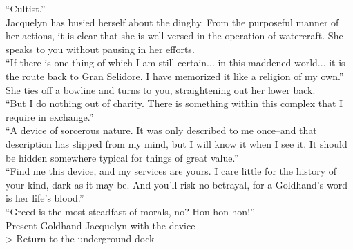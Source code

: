 “Cultist.”\\

Jacquelyn has busied herself about the dinghy. From the purposeful manner of her actions, it is clear that she is well-versed in the operation of watercraft. She speaks to you without pausing in her efforts.\\

“If there is one thing of which I am still certain... in this maddened world... it is the route back to Gran Selidore. I have memorized it like a religion of my own.”\\

She ties off a bowline and turns to you, straightening out her lower back.\\

“But I do nothing out of charity. There is something within this complex that I require in exchange.”\\

“A device of sorcerous nature. It was only described to me once--and that description has slipped from my mind, but I will know it when I see it. It should be hidden somewhere typical for things of great value.”\\

“Find me this device, and my services are yours. I care little for the history of your kind, dark as it may be. And you’ll risk no betrayal, for a Goldhand’s word is her life’s blood.”\\

“Greed is the most steadfast of morals, no? Hon hon hon!”\\

 Present Goldhand Jacquelyn with the device -- \\
> Return to the underground dock -- 